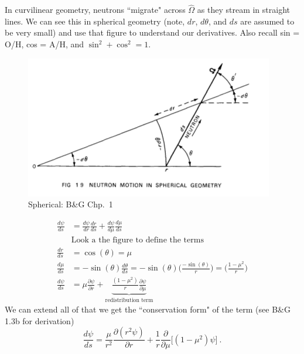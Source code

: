 \documentclass[12pt]{article}
\newcommand{\vOmega}{\ensuremath{\hat{\Omega}}}
\begin{document}
In curvilinear geometry, neutrons ``migrate" across $\vOmega$ as they stream in straight lines. 
We can see this in spherical geometry (note, $dr$, $d\theta$, and $ds$ are assumed to be very small) and use that figure to understand our derivatives. Also recall sin = O/H, cos = A/H, and $\sin^2 + \cos^2 = 1$.
%
\begin{figure}[h!]
    \begin{center}
    \includegraphics[keepaspectratio, width = 4.5 in]{../figs/n-motion-sph}
    \end{center}    
    \label{fig:sph-m} 
    \caption{Spherical: B\&G Chp.\ 1}
\end{figure}

\begin{align*}
\frac{d \psi}{ds} &= \frac{d \psi}{dr} \frac{dr}{ds} + \frac{d\psi}{d\mu} \frac{d\mu}{ds} \\
&\text{Look a the figure to define the terms}\\
\frac{dr}{ds} &= \cos(\theta) = \mu \\
%
\frac{d \mu}{ds} &= -\sin(\theta) \frac{d \theta}{ds} = -\sin(\theta) \biggl(\frac{-\sin(\theta)}{r} \biggr) = \biggl(\frac{1 - \mu^2}{r} \biggr) \\
%
\frac{d\psi}{ds} &= \mu \frac{\partial \psi}{\partial r} + \underbrace{\frac{(1 - \mu^2)}{r}\frac{\partial \psi}{\partial \mu}}_{\text{redistribution term}}
\end{align*}
%
We can extend all of that we get the ``conservation form" of the term (see B\&G 1.3b for derivation)
\[\frac{d\psi}{ds} = \frac{\mu}{r^2} \frac{\partial(r^2 \psi)}{\partial r} + \frac{1}{r} \frac{\partial}{\partial \mu}\bigl[(1 - \mu^2) \psi \bigr] \:. \]
\end{document}
